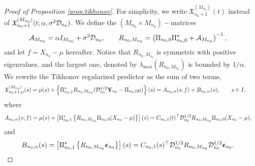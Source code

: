 \documentclass{article}
\begin{document}
\begin{proof}[Proof of Proposition \ref{prop:tikhonov}]
For simplicity, we write $\mathfrak{X}^{(M_{n_0})}_{n_0+1}(t )$ instead of $\mathfrak{X}^{(M_{n_0})}_{n_0+1}(t;\alpha,\sigma^2 \mathcal{D}_{n_0} )$. 
We define the $(M_{n_0}\times M_{n_0})-$matrices 
$$ 
\mathcal A _{M_{n_0}} = \alpha I_{M_{n_0}} +  \sigma^2  \mathcal{D}_{n_0}, \qquad  
R_{n_0,M_{n_0}} = \left(\Pi_{n_0,0}\Pi_{n_0,0}^\star + \mathcal A_{M_{n_0}} \right)^{-1},
$$ 
and let $f=X_{n_0}-\mu$ hereafter.  Notice that $R_{n_0,M_{n_0}}$ is symmetric with positive eigenvalues, and the largest one, denoted by $\lambda_{\max} (R_{n_0,M_{n_0}})$  is bounded by $1/\alpha$.
We rewrite the Tikhonov regularized predictor as the sum of two terms,
\begin{align*}
	\mathfrak{X}^{(M_{n_0})}_{n_0+1,\alpha}(s)&= \mu(s) + \left\{\Pi_{n_0,1}^\star R_{n_0,M_{n_0}}( \mathcal{D}_{n_0}^{1/2}\mathbf{Y}_{n_0}-\Pi_{n_0,0}\mu)\right\}(s) = A_{n_0,\alpha}(s;f) + B_{n_0,\alpha}(s), \qquad s\in I,
\end{align*}
where
$$
A_{n_0,\alpha}(s;f) = \mu(s) + \left[\Pi_{n_0,1}^\star \left\{R_{n_0,M_{n_0}}\Pi_{n_0,0}(X_{n_0}-\mu)\right\}\right](s) =C_{n_0,1}(t)^\top  \mathcal{D}_{n_0}^{1/2} R_{n_0,M_{n_0}}  \Pi_{n_0,0}(X_{n_0}-\mu),
$$
and 
$$
B_{n_0,\alpha}(s) = \left[\Pi_{n_0,1}^\star \left\{R_{n_0,M_{n_0}}\boldsymbol{\epsilon}_{n_0}\right\}\right](s)=  C_{n_0,1}(s)^\top  \mathcal{D}_{n_0}^{1/2} R_{n_0,M_{n_0}}  \mathcal{D}_{n_0}^{1/2} \boldsymbol{\epsilon}_{n_0} .
$$


\end{proof}
\end{document}
